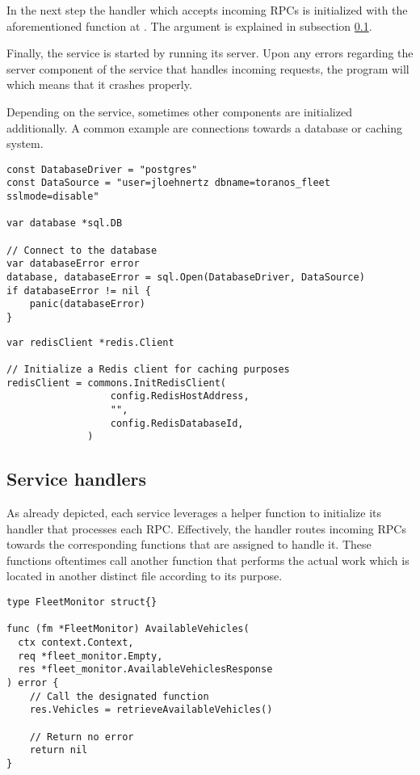 \documentclass[12pt,a4paper,twoside]{report}
\begin{document}
In the next step the handler which accepts incoming RPCs is initialized with the
aforementioned function at .
The argument  is explained in subsection \ref{subsect:service-handlers}.

Finally, the service is started by running its server. Upon any errors regarding
the server component of the service that handles incoming requests,
the program will  which means that it crashes properly.

Depending on the service, sometimes other components are initialized additionally.
A common example are connections towards a database or caching system.

\begin{lstlisting}[title=services/fleet-controller/main.go]
const DatabaseDriver = "postgres"
const DataSource = "user=jloehnertz dbname=toranos_fleet sslmode=disable"

var database *sql.DB

// Connect to the database
var databaseError error
database, databaseError = sql.Open(DatabaseDriver, DataSource)
if databaseError != nil {
	panic(databaseError)
}
\end{lstlisting}

\begin{lstlisting}[title=services/fleet-monitor/main.go]
var redisClient *redis.Client

// Initialize a Redis client for caching purposes
redisClient = commons.InitRedisClient(
                  config.RedisHostAddress,
                  "",
                  config.RedisDatabaseId,
              )
\end{lstlisting}

\subsection{Service handlers} \label{subsect:service-handlers}

As already depicted, each service leverages a helper function to initialize
its handler that processes each RPC. Effectively, the handler routes incoming
RPCs towards the corresponding functions that are assigned to handle it.
These functions oftentimes call another function that performs the actual work
which is located in another distinct file according to its purpose.

\begin{lstlisting}[title=services/fleet-monitor/main.go]
type FleetMonitor struct{}

func (fm *FleetMonitor) AvailableVehicles(
  ctx context.Context,
  req *fleet_monitor.Empty,
  res *fleet_monitor.AvailableVehiclesResponse
) error {
    // Call the designated function
	res.Vehicles = retrieveAvailableVehicles()

    // Return no error
	return nil
}
\end{lstlisting}
\end{document}
